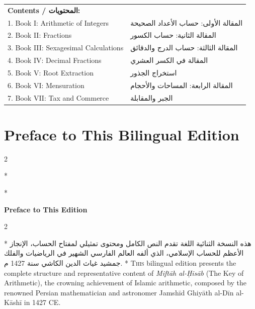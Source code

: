\documentclass[11pt,a4paper]{article}
\newcommand{\ar}[1]{{\arabicfont\beginR #1\endR}}
\newenvironment{bilingual}{%
  \vspace{0.3em}%
  \begin{paracol}{2}%
}{%
  \end{paracol}%
  \vspace{0.3em}%
}
\begin{document}
\begin{center}
\begin{tabular}{p{}p{}}
\textbf{Contents / \ar{المحتويات}:} & \\
1. Book I: Arithmetic of Integers & \ar{المقالة الأولى: حساب الأعداد الصحيحة} \\
2. Book II: Fractions & \ar{المقالة الثانية: حساب الكسور} \\
3. Book III: Sexagesimal Calculations & \ar{المقالة الثالثة: حساب الدرج والدقائق} \\
4. Book IV: Decimal Fractions & \ar{المقالة في الكسر العشري} \\
5. Book V: Root Extraction & \ar{استخراج الجذور} \\
6. Book VI: Mensuration & \ar{المقالة الرابعة: المساحات والأحجام} \\
7. Book VII: Tax and Commerce & \ar{الجبر والمقابلة} \\
\end{tabular}

\vspace{0.8cm}

\end{center}
\clearpage

\tableofcontents
\clearpage

\section*{Preface to This Bilingual Edition}

\begin{bilingual}
\switchcolumn[0]*
\begin{center}
\textbf{\color{chapcolor}\ar{كلمة في هذه النسخة}}
\end{center}
\switchcolumn[1]*
\begin{center}
\textbf{\color{chapcolor}Preface to This Edition}
\end{center}
\end{bilingual}

\begin{bilingual}
\switchcolumn[0]*
\ar{هذه النسخة الثنائية اللغة تقدم النص الكامل ومحتوى تمثيلي لمفتاح الحساب، الإنجاز الأعظم للحساب الإسلامي، الذي ألفه العالم الفارسي الشهير في الرياضيات والفلك جمشيد غياث الدين الكاشي سنة 1427 م.}
\switchcolumn[1]*
\lettrine[lines=3, nindent=0em, findent=3pt]{\color{chapcolor}T}{his}
bilingual edition presents the complete structure and representative content of
\textit{Mift\=ah al-\d{H}is\=ab} (The Key of Arithmetic), the crowning
achievement of Islamic arithmetic, composed by the renowned Persian
mathematician and astronomer Jamsh\=id Ghiy\=ath al-D\=in al-K\=ash\=i in 1427 CE.
\end{bilingual}
\end{document}
